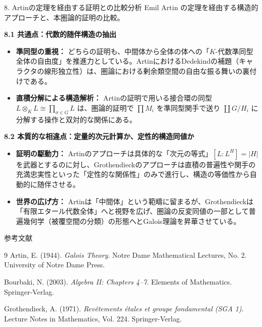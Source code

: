 \documentclass[10pt, unicode]{beamer}
\theoremstyle{definition}
\begin{document}
\begin{frame}[allowframebreaks]{8. Artinの定理を経由する証明との比較分析}
    Emil Artin の定理を経由する構造的アプローチと、本圏論的証明の比較。

    \textbf{8.1 共通点：代数的随伴構造の抽出}
    \begin{itemize}
        \item \textbf{準同型の重視：} どちらの証明も、中間体から全体の体への「$K$-代数準同型全体の自由度」を推進力としている。ArtinにおけるDedekindの補題（キャラクタの線形独立性）は、圏論における剰余類空間の自由な振る舞いの裏付けである。
        \item \textbf{直積分解による構造解析：} Artinの証明で用いる接合環の同型 $L \otimes_K L \cong \prod_{\sigma \in G} L$ は、圏論的証明で $\prod M_i$ を準同型関手で送り $\coprod G/H_i$ に分解する操作と双対的な関係にある。
    \end{itemize}

    \textbf{8.2 本質的な相違点：定量的次元計算か、定性的構造同値か}
    \begin{itemize}
        \item \textbf{証明の駆動力：} Artinのアプローチは具体的な「次元の等式」$[L:L^H] = |H|$ を武器とするのに対し、Grothendieckのアプローチは直積の普遍性や関手の充満忠実性といった「定性的な関係性」のみで進行し、構造の等価性から自動的に随伴させる。
        \item \textbf{世界の広げ方：} Artinは「中間体」という範疇に留まるが、Grothendieckは「有限エタール代数全体」へと視野を広げ、圏論の反変同値の一部として普遍幾何学（被覆空間の分類）の形態へとGalois理論を昇華させている。
    \end{itemize}
\end{frame}

\begin{frame}[allowframebreaks]{参考文献}
    \begin{thebibliography}{9}
        Artin, E. (1944). \emph{Galois Theory}. Notre Dame Mathematical Lectures, No. 2. University of Notre Dame Press.
        
        Bourbaki, N. (2003). \emph{Algebra II: Chapters 4–7}. Elements of Mathematics. Springer-Verlag.
        
        Grothendieck, A. (1971). \emph{Revêtements étales et groupe fondamental (SGA 1)}. Lecture Notes in Mathematics, Vol. 224. Springer-Verlag.
    \end{thebibliography}
\end{frame}
\end{document}
